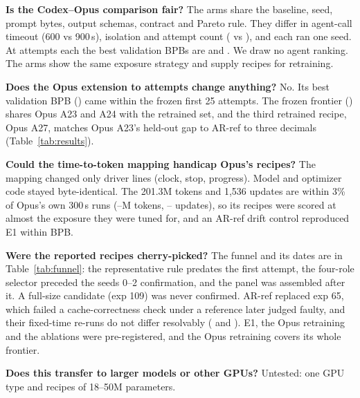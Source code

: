 \documentclass{article}
\begin{document}
\textbf{Is the Codex--Opus comparison fair?} The arms share the baseline, seed, prompt bytes, output schemas, contract and Pareto rule. They differ in agent-call timeout (600 vs 900\,s), isolation and attempt count (\CRCxAttempts{} vs \CROpAttempts), and each ran one seed. At \CRCxAttempts{} attempts each the best validation BPBs are \CRCxBestBPB{} and \CROpBestTwentyTwo. We draw no agent ranking. The arms show the same exposure strategy and supply recipes for retraining.

\textbf{Does the Opus extension to \CROpAttempts{} attempts change anything?} No. Its best validation BPB (\CROpBestFrozen) came within the frozen first 25 attempts. The frozen frontier (\CROpFrontierFrozen) shares Opus A23 and A24 with the retrained set, and the third retrained recipe, Opus A27, matches Opus A23's held-out gap to AR-ref to three decimals (Table~\ref{tab:results}).

\textbf{Could the time-to-token mapping handicap Opus's recipes?} The mapping changed only driver lines (clock, stop, progress). Model and optimizer code stayed byte-identical. The 201.3M tokens and 1{,}536 updates are within 3\% of Opus's own 300\,s runs (\CROpTokLo--\CROpTokHi M tokens, \CROpUpdLo--\CROpUpdHi{} updates), so its recipes were scored at almost the exposure they were tuned for, and an AR-ref drift control reproduced E1 within \CRMTDriftAbs{} BPB.

\textbf{Were the reported recipes cherry-picked?} The funnel and its dates are in Table~\ref{tab:funnel}: the representative rule predates the first attempt, the four-role selector preceded the seeds 0--2 confirmation, and the panel was assembled after it. A full-size candidate (exp 109) was never confirmed. AR-ref replaced exp 65, which failed a cache-correctness check under a reference later judged faulty, and their fixed-time re-runs do not differ resolvably (\CRFixedSixtyFive{} and \CRFixedSixtyEight). E1, the Opus retraining and the ablations were pre-registered, and the Opus retraining covers its whole frontier.

\textbf{Does this transfer to larger models or other GPUs?} Untested: one GPU type and recipes of 18--50M parameters.
\end{document}
